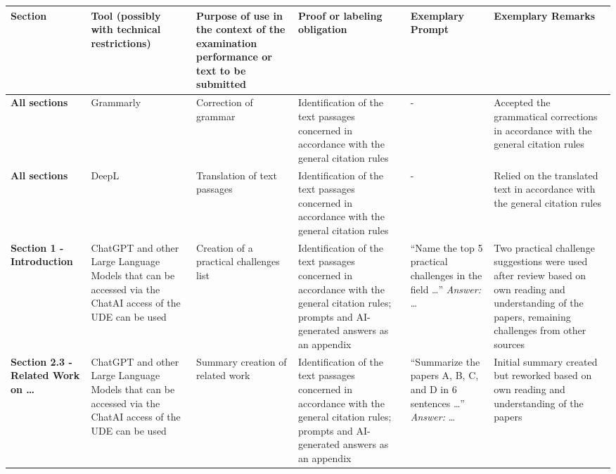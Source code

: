 \begin{longtable}{|R{1.7cm}|R{2.3cm}|R{2.3cm}|R{2.4cm}|R{2.5cm}|R{2.6cm}|}
\hline
{}
\textbf{\color{white} Section} &
\textbf{\color{white} Tool (possibly with technical restrictions)} &
\textbf{\color{white} Purpose of use in the context of the examination performance or text to be submitted} &
\textbf{\color{white} Proof or labeling obligation} &
\textbf{\color{white} Exemplary Prompt} &
\textbf{\color{white} Exemplary Remarks} \\
\hline
\textbf{All sections} & Grammarly & Correction of grammar & Identifi\-cation of the text passages concerned in accordance with the general citation rules & - & Accepted the grammatical corrections in accordance with the general citation rules \\
\hline
\textbf{All sections} & DeepL & Translation of text passages & Identifi\-cation of the text passages concerned in accordance with the general citation rules & - & Relied on the translated text in accordance with the general citation rules \\
\hline
\textbf{Section 1 - Introduction} & ChatGPT and other Large Language Models that can be accessed via the ChatAI access of the UDE can be used & Creation of a practical challenges list & Identifi\-cation of the text passages concerned in accordance with the general citation rules; prompts and AI-generated answers as an appendix & \enquote{Name the top 5 practical challenges in the field …} \enspace\textit{Answer:} … & Two practical challenge suggestions were used after review based on own reading and understanding of the papers, remaining challenges from other sources \\
\hline
\textbf{Section 2.3 - Related Work on …} & ChatGPT and other Large Language Models that can be accessed via the ChatAI access of the UDE can be used & Summary creation of related work & Identifi\-cation of the text passages concerned in accordance with the general citation rules; prompts and AI-generated answers as an appendix & \enquote{Summarize the papers A, B, C, and D in 6 sentences …} \enspace\textit{Answer:} … & Initial summary created but reworked based on own reading and understanding of the papers  \\

\end{longtable}
